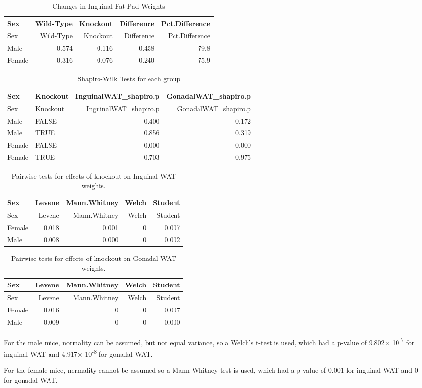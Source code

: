 \documentclass[]{article}
\begin{document}
\begin{longtable}[]{@{}lrrrr@{}}
\caption{Changes in Inguinal Fat Pad Weights}\tabularnewline
\toprule
Sex & Wild-Type & Knockout & Difference & Pct.Difference\tabularnewline
\midrule
\endfirsthead
\toprule
Sex & Wild-Type & Knockout & Difference & Pct.Difference\tabularnewline
\midrule
\endhead
Male & 0.574 & 0.116 & 0.458 & 79.8\tabularnewline
Female & 0.316 & 0.076 & 0.240 & 75.9\tabularnewline
\bottomrule
\end{longtable}

\begin{longtable}[]{@{}llrr@{}}
\caption{Shapiro-Wilk Tests for each group}\tabularnewline
\toprule
Sex & Knockout & InguinalWAT\_shapiro.p &
GonadalWAT\_shapiro.p\tabularnewline
\midrule
\endfirsthead
\toprule
Sex & Knockout & InguinalWAT\_shapiro.p &
GonadalWAT\_shapiro.p\tabularnewline
\midrule
\endhead
Male & FALSE & 0.400 & 0.172\tabularnewline
Male & TRUE & 0.856 & 0.319\tabularnewline
Female & FALSE & 0.000 & 0.000\tabularnewline
Female & TRUE & 0.703 & 0.975\tabularnewline
\bottomrule
\end{longtable}

\begin{longtable}[]{@{}lrrrr@{}}
\caption{Pairwise tests for effects of knockout on Inguinal WAT
weights.}\tabularnewline
\toprule
Sex & Levene & Mann.Whitney & Welch & Student\tabularnewline
\midrule
\endfirsthead
\toprule
Sex & Levene & Mann.Whitney & Welch & Student\tabularnewline
\midrule
\endhead
Female & 0.018 & 0.001 & 0 & 0.007\tabularnewline
Male & 0.008 & 0.000 & 0 & 0.002\tabularnewline
\bottomrule
\end{longtable}

\begin{longtable}[]{@{}lrrrr@{}}
\caption{Pairwise tests for effects of knockout on Gonadal WAT
weights.}\tabularnewline
\toprule
Sex & Levene & Mann.Whitney & Welch & Student\tabularnewline
\midrule
\endfirsthead
\toprule
Sex & Levene & Mann.Whitney & Welch & Student\tabularnewline
\midrule
\endhead
Female & 0.016 & 0 & 0 & 0.007\tabularnewline
Male & 0.009 & 0 & 0 & 0.000\tabularnewline
\bottomrule
\end{longtable}

For the male mice, normality can be assumed, but not equal variance, so
a Welch's t-test is used, which had a p-value of 9.802×
10\textsuperscript{-7} for inguinal WAT and 4.917×
10\textsuperscript{-8} for gonadal WAT.

For the female mice, normality cannot be assumed so a Mann-Whitney test
is used, which had a p-value of 0.001 for inguinal WAT and 0 for gonadal
WAT.
\end{document}

